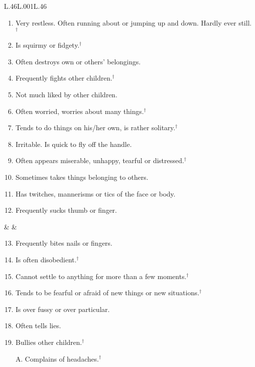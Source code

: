

\begin{table}[ht!]
\caption{Behavioural screening scales in the BCS and MCS five-year surveys}\label{tab:scales}
\centering{} \footnotesize
\begin{tabular}{L{.46\linewidth}L{.001\linewidth}L{.46\linewidth}}
\toprule
{} \\[-1.8em]
\begin{enumerate}
\item Very restless. Often running about or jumping up and down. Hardly ever still.$^\dagger$
\item Is squirmy or fidgety.$^\dagger$
\item Often destroys own or others' belongings.
\item Frequently fights other children.$^\dagger$
\item Not much liked by other children.
\item Often worried, worries about many things.$^\dagger$
\item Tends to do things on his/her own, is rather solitary.$^\dagger$
\item Irritable. Is quick to fly off the handle.
\item Often appears miserable, unhappy, tearful or distressed.$^\dagger$
\item Sometimes takes things belonging to others.
\item Has twitches, mannerisms or tics of the face or body.
\item Frequently sucks thumb or finger.
\end{enumerate}
& &
\begin{enumerate}\setcounter{enumi}{12}
\item Frequently bites nails or fingers.
\item Is often disobedient.$^\dagger$
\item Cannot settle to anything for more than a few moments.$^\dagger$
\item Tends to be fearful or afraid of new things or new situations.$^\dagger$
\item Is over fussy or over particular.
\item Often tells lies.
\item Bullies other children.$^\dagger$
\item[A.] Complains of headaches.$^\dagger$

\end{enumerate}
\end{tabular}
\end{table}
